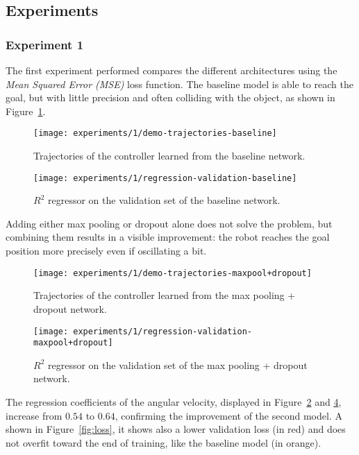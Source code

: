 \subsection{Experiments}
\subsubsection{Experiment 1}
The first experiment performed compares the different architectures using the 
\emph{Mean Squared Error (MSE)} loss function.
The baseline model is able to reach the goal, but with little precision and 
often colliding with the object, as shown in Figure~\ref{fig:baseline}.

\begin{figure}[htbp]
	\centerline{\texttt{[image: experiments/1/demo-trajectories-baseline]}}
	\caption{Trajectories of the controller learned from the baseline network.}
	\label{fig:baseline}
\end{figure}

\begin{figure}[htbp]
	\centerline{\texttt{[image: experiments/1/regression-validation-baseline]}}
	\caption{$R^2$ regressor on the validation set of the baseline network.}
	\label{fig:regression-baseline}
\end{figure}

Adding either max pooling or dropout alone does not solve the problem, but 
combining them results in a visible improvement: the robot reaches the goal 
position more precisely even if oscillating a bit.

\begin{figure}[htbp]
	\centerline{\texttt{[image: experiments/1/demo-trajectories-maxpool+dropout]}}
	\caption{Trajectories of the controller learned from the max pooling + 
	dropout network.}
	\label{fig:maxpool+dropout}
\end{figure}

\begin{figure}[htbp]
	\centerline{\texttt{[image: experiments/1/regression-validation-maxpool+dropout]}}
	\caption{$R^2$ regressor on the validation set of the max pooling + dropout 
	network.}
	\label{fig:regression-maxpool+dropout}
\end{figure}

The regression coefficients of the angular velocity, displayed in 
Figure~\ref{fig:regression-baseline} and \ref{fig:regression-maxpool+dropout}, 
increase from $0.54$ to $0.64$, confirming the improvement of the second model.
A shown in Figure~\ref{fig:loss}, it shows also a lower validation loss (in 
red) and does not overfit toward the end of training, like the baseline model 
(in orange).

